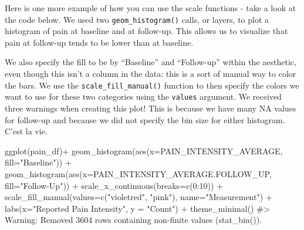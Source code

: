 \documentclass[
  letterpaper,
]{krantz}
\makeatletter
\newenvironment{Shaded}{\begin{snugshade}}{\end{snugshade}}
\newcommand{\AttributeTok}[1]{\textcolor[rgb]{0.40,0.45,0.13}{#1}}
\newcommand{\CommentTok}[1]{\textcolor[rgb]{0.37,0.37,0.37}{#1}}
\newcommand{\DecValTok}[1]{\textcolor[rgb]{0.68,0.00,0.00}{#1}}
\newcommand{\FunctionTok}[1]{\textcolor[rgb]{0.28,0.35,0.67}{#1}}
\newcommand{\NormalTok}[1]{\textcolor[rgb]{0.00,0.23,0.31}{#1}}
\newcommand{\SpecialCharTok}[1]{\textcolor[rgb]{0.37,0.37,0.37}{#1}}
\newcommand{\StringTok}[1]{\textcolor[rgb]{0.13,0.47,0.30}{#1}}
\newenvironment{kframe}{%
\medskip{}
\setlength{\fboxsep}{.8em}
 \def\at@end@of@kframe{}%
 \ifinner\ifhmode%
  \def\at@end@of@kframe{\end{minipage}}%
  \begin{minipage}{\columnwidth}%
 \fi\fi%
 \def\FrameCommand##1{\hskip\@totalleftmargin \hskip-\fboxsep
 \colorbox{shadecolor}{##1}\hskip-\fboxsep
     \hskip-\linewidth \hskip-\@totalleftmargin \hskip\columnwidth}%
 \MakeFramed {\advance\hsize-\width
   \@totalleftmargin\z@ \linewidth\hsize
   \@setminipage}}%
 {\par\unskip\endMakeFramed%
 \at@end@of@kframe}
\renewenvironment{Shaded}{\begin{kframe}}{\end{kframe}}
\makeatother
\begin{document}
Here is one more example of how you can use the scale functions - take a
look at the code below. We used two \texttt{geom\_histogram()} calls, or
layers, to plot a histogram of pain at baseline and at follow-up. This
allows us to visualize that pain at follow-up tends to be lower than at
baseline.

We also specify the fill to be by ``Baseline'' and ``Follow-up'' within
the aesthetic, even though this isn't a column in the data: this is a
sort of manual way to color the bars. We use the
\texttt{scale\_fill\_manual()} function to then specify the colors we
want to use for these two categories using the \texttt{values} argument.
We received three warnings when creating this plot! This is because we
have many NA values for follow-up and because we did not specify the bin
size for either histogram. C'est la vie.

\begin{Shaded}
\begin{Highlighting}[]
\FunctionTok{ggplot}\NormalTok{(pain\_df)}\SpecialCharTok{+}
  \FunctionTok{geom\_histogram}\NormalTok{(}\FunctionTok{aes}\NormalTok{(}\AttributeTok{x=}\NormalTok{PAIN\_INTENSITY\_AVERAGE, }\AttributeTok{fill=}\StringTok{"Baseline"}\NormalTok{)) }\SpecialCharTok{+}
  \FunctionTok{geom\_histogram}\NormalTok{(}\FunctionTok{aes}\NormalTok{(}\AttributeTok{x=}\NormalTok{PAIN\_INTENSITY\_AVERAGE.FOLLOW\_UP, }
                     \AttributeTok{fill=}\StringTok{"Follow{-}Up"}\NormalTok{)) }\SpecialCharTok{+}
  \FunctionTok{scale\_x\_continuous}\NormalTok{(}\AttributeTok{breaks=}\FunctionTok{c}\NormalTok{(}\DecValTok{0}\SpecialCharTok{:}\DecValTok{10}\NormalTok{)) }\SpecialCharTok{+} 
  \FunctionTok{scale\_fill\_manual}\NormalTok{(}\AttributeTok{values=}\FunctionTok{c}\NormalTok{(}\StringTok{"violetred"}\NormalTok{, }\StringTok{"pink"}\NormalTok{), }
                    \AttributeTok{name=}\StringTok{"Measurement"}\NormalTok{) }\SpecialCharTok{+}
  \FunctionTok{labs}\NormalTok{(}\AttributeTok{x=}\StringTok{"Reported Pain Intensity"}\NormalTok{, }\AttributeTok{y =} \StringTok{"Count"}\NormalTok{) }\SpecialCharTok{+}
  \FunctionTok{theme\_minimal}\NormalTok{()}
\CommentTok{\#\textgreater{} Warning: Removed 3604 rows containing non{-}finite values (\textasciigrave{}stat\_bin()\textasciigrave{}).}
\end{Highlighting}
\end{Shaded}
\end{document}
